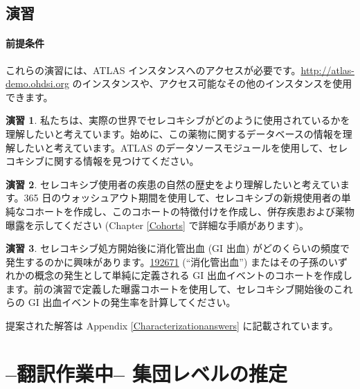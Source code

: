 \documentclass[
  11pt]{book}
\theoremstyle{definition}
\theoremstyle{definition}
\theoremstyle{definition}
\newtheorem{exercise}{演習}[chapter]
\theoremstyle{definition}
\theoremstyle{remark}
\begin{document}
\section{演習}\label{ux6f14ux7fd2-4}

\subsubsection*{前提条件}\label{ux524dux63d0ux6761ux4ef6-6}

これらの演習には、ATLAS インスタンスへのアクセスが必要です。\url{http://atlas-demo.ohdsi.org} のインスタンスや、アクセス可能なその他のインスタンスを使用できます。

\begin{exercise}
\protect\hypertarget{exr:exerciseCharacterization1}{}\label{exr:exerciseCharacterization1}私たちは、実際の世界でセレコキシブがどのように使用されているかを理解したいと考えています。始めに、この薬物に関するデータベースの情報を理解したいと考えています。ATLAS のデータソースモジュールを使用して、セレコキシブに関する情報を見つけてください。
\end{exercise}

\begin{exercise}
\protect\hypertarget{exr:exerciseCharacterization2}{}\label{exr:exerciseCharacterization2}セレコキシブ使用者の疾患の自然の歴史をより理解したいと考えています。365 日のウォッシュアウト期間を使用して、セレコキシブの新規使用者の単純なコホートを作成し、このコホートの特徴付けを作成し、併存疾患および薬物曝露を示してください (Chapter \ref{Cohorts} で詳細な手順があります)。
\end{exercise}

\begin{exercise}
\protect\hypertarget{exr:exerciseCharacterization3}{}\label{exr:exerciseCharacterization3}セレコキシブ処方開始後に消化管出血 (GI 出血) がどのくらいの頻度で発生するのかに興味があります。\href{http://athena.ohdsi.org/search-terms/terms/192671}{192671} (``消化管出血'') またはその子孫のいずれかの概念の発生として単純に定義される GI 出血イベントのコホートを作成します。前の演習で定義した曝露コホートを使用して、セレコキシブ開始後のこれらの GI 出血イベントの発生率を計算してください。
\end{exercise}

提案された解答は Appendix \ref{Characterizationanswers} に記載されています。

\chapter{--翻訳作業中-- 集団レベルの推定}\label{PopulationLevelEstimation}
\end{document}

